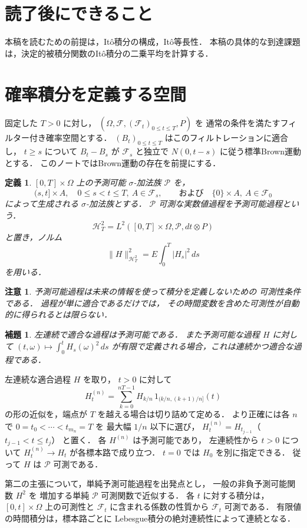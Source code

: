 \documentclass[a5paper,10pt,onecolumn]{jsarticle}
\makeatletter
\theoremstyle{mathnotetheorem}
\newtheorem{definition}[theorem]{定義}
\newtheorem{lemma}[theorem]{補題}
\newtheorem{remark}[theorem]{注意}
\renewcommand{\proofname}{証明}
\renewenvironment{proof}[1][\proofname]{%
  \par\pushQED{\qed}\normalfont\topsep4\p@\@plus2\p@\relax
  \trivlist\item[\hskip\labelsep\bfseries #1]\ignorespaces
}{\popQED\endtrivlist\@endpefalse}
\newcommand{\norm}[1]{\lVert #1\rVert}
\makeatother
\begin{document}
\section*{読了後にできること}
本稿を読むための前提は，Itô積分の構成，Itô等長性．
本稿の具体的な到達課題は，決定的被積分関数のItô積分の二乗平均を計算する．

\section{確率積分を定義する空間}

固定した $T>0$ に対し，
$(\Omega,\mathcal F,(\mathcal F_t)_{0\le t\le T},P)$ を
通常の条件を満たすフィルター付き確率空間とする．
$(B_t)_{0\le t\le T}$ はこのフィルトレーションに適合し，
$t\ge s$ について $B_t-B_s$ が
$\mathcal F_s$ と独立で $N(0,t-s)$ に従う標準Brown運動とする．
このノートではBrown運動の存在を前提にする．

\begin{definition}
$[0,T]\times\Omega$ 上の\emph{予測可能 $\sigma$-加法族}
$\mathcal P$ を，
\[
 (s,t]\times A,\quad 0\le s<t\le T,\ A\in\mathcal F_s,
 \qquad\text{および}\quad \{0\}\times A,\ A\in\mathcal F_0
\]
によって生成される $\sigma$-加法族とする．
$\mathcal P$ 可測な実数値過程を\emph{予測可能過程}という．
\[
 \mathcal H^2_T
 =L^2([0,T]\times\Omega,\mathcal P,dt\otimes P)
\]
と置き，ノルム
\[
 \norm H_{\mathcal H^2_T}^2
 =E\int_0^T|H_s|^2\,ds
\]
を用いる．
\end{definition}

\begin{remark}
予測可能過程は未来の情報を使って積分を定義しないための
可測性条件である．
過程が単に適合であるだけでは，
その時間変数を含めた可測性が自動的に得られるとは限らない．
\end{remark}

\begin{lemma}\label{lem:predictable}
左連続で適合な過程は予測可能である．
また予測可能な過程 $H$ に対して
$(t,\omega)\mapsto\int_0^tH_s(\omega)^2\,ds$
が有限で定義される場合，これは連続かつ適合な過程である．
\end{lemma}
\begin{proof}
左連続な適合過程 $H$ を取り，
$t>0$ に対して
\[
 H^{(n)}_t
 =\sum_{k=0}^{nT-1}
 H_{k/n}\,1_{(k/n,(k+1)/n]}(t)
\]
の形の近似を，端点が $T$ を越える場合は切り詰めて定める．
より正確には各 $n$ で $0=t_0<\cdots<t_{m_n}=T$ を
最大幅 $1/n$ 以下に選び，
$H^{(n)}_t=H_{t_{j-1}}$（$t_{j-1}<t\le t_j$）
と置く．
各 $H^{(n)}$ は予測可能であり，
左連続性から $t>0$ について
$H^{(n)}_t\to H_t$ が各標本路で成り立つ．
$t=0$ では $H_0$ を別に指定できる．
従って $H$ は $\mathcal P$ 可測である．

第二の主張について，単純予測可能過程を出発点とし，
一般の非負予測可能関数 $H^2$ を
増加する単純 $\mathcal P$ 可測関数で近似する．
各 $t$ に対する積分は，
$[0,t]\times\Omega$ 上の可測性と
$\mathcal F_t$ に含まれる係数の性質から
$\mathcal F_t$ 可測である．
有限値の時間積分は，標本路ごとに
Lebesgue積分の絶対連続性によって連続となる．
\end{proof}
\end{document}
